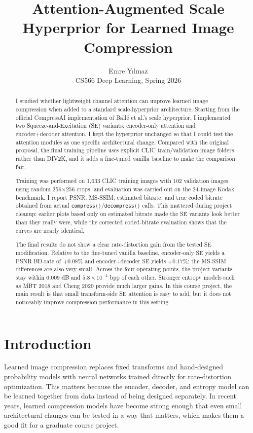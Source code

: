 \documentclass[10pt]{article}
\title{\textbf{Attention-Augmented Scale Hyperprior for Learned Image Compression}}
\author{Emre Y{\i}lmaz \\ CS566 Deep Learning, Spring 2026}
\date{}
\begin{document}
\maketitle

\begin{abstract}
I studied whether lightweight channel attention can improve learned image compression when added to a standard scale-hyperprior architecture. Starting from the official CompressAI implementation of Ball\'e et al.'s scale hyperprior, I implemented two Squeeze-and-Excitation (SE) variants: encoder-only attention and encoder+decoder attention. I kept the hyperprior unchanged so that I could test the attention modules as one specific architectural change. Compared with the original proposal, the final training pipeline uses explicit CLIC train/validation image folders rather than DIV2K, and it adds a fine-tuned vanilla baseline to make the comparison fair.

Training was performed on 1,633 CLIC training images with 102 validation images using random 256$\times$256 crops, and evaluation was carried out on the 24-image Kodak benchmark. I report PSNR, MS-SSIM, estimated bitrate, and true coded bitrate obtained from actual \texttt{compress()}/\texttt{decompress()} calls. This mattered during project cleanup: earlier plots based only on estimated bitrate made the SE variants look better than they really were, while the corrected coded-bitrate evaluation shows that the curves are nearly identical.

The final results do not show a clear rate-distortion gain from the tested SE modification. Relative to the fine-tuned vanilla baseline, encoder-only SE yields a PSNR BD-rate of \(+0.08\%\) and encoder+decoder SE yields \(+0.17\%\); the MS-SSIM differences are also very small. Across the four operating points, the project variants stay within \(0.009\) dB and \(5.8\times 10^{-4}\) bpp of each other. Stronger entropy models such as MBT 2018 and Cheng 2020 provide much larger gains. In this course project, the main result is that small transform-side SE attention is easy to add, but it does not noticeably improve compression performance in this setting.
\end{abstract}

\section{Introduction}
Learned image compression replaces fixed transforms and hand-designed probability models with neural networks trained directly for rate-distortion optimization. This matters because the encoder, decoder, and entropy model can be learned together from data instead of being designed separately. In recent years, learned compression models have become strong enough that even small architectural changes can be tested in a way that matters, which makes them a good fit for a graduate course project.
\end{document}
